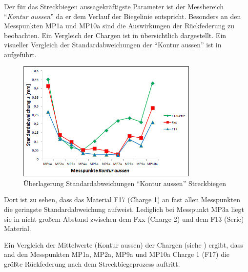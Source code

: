 \documentclass[12pt,a4paper,parskip]{scrartcl}
\begin{document}
Der für das Streckbiegen aussagekräftigste Parameter ist der Messbereich "`\emph{Kontur aussen}"' da er dem Verlauf der Biegelinie entspricht. Besonders an den Messpunkten MP1a und MP10a sind die Auswirkungen der Rückfederung zu beobachten. Ein Vergleich der Chargen ist in  übersichtlich dargestellt. Ein visueller Vergleich der Standardabweichungen der "`Kontur aussen"' ist in  aufgeführt.
\begin{figure}[hbtp]
\centering
\includegraphics[width=0.8\textwidth]{standardstreckb}
\caption{Überlagerung Standardabweichungen "`Kontur aussen"' Streckbiegen}
\label{fig:svstb}
\end{figure}
Dort ist zu sehen, dass das Material F17 (Charge 1) an fast allen Messpunkten die geringste Standardabweichung aufweist. Lediglich bei Messpunkt MP3a liegt sie in nicht großem Abstand zwischen dem Fxx (Charge 2) und dem F13 (Serie) Material.

Ein Vergleich der Mittelwerte (Kontur aussen) der Chargen (siehe  ) ergibt, dass and den Messpunkten MP1a, MP2a, MP9a und MP10a  Charge 1 (F17) die größte Rückfederung nach dem Streckbiegeprozess auftritt.
\end{document}
